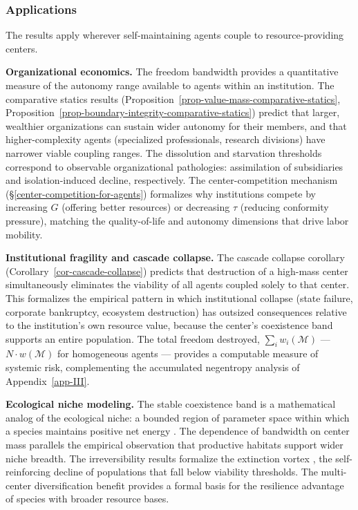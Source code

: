 \documentclass[11pt]{article}
\theoremstyle{plain}
\theoremstyle{definition}
\theoremstyle{remark}
\let\origsubsubsection\subsubsection
\renewcommand{\subsubsection}{\needspace{4\baselineskip}\origsubsubsection}
\begin{document}
\subsubsection{Applications}\label{applications-5}

The results apply wherever self-maintaining agents couple to
resource-providing centers.

\textbf{Organizational economics.} The freedom bandwidth provides a
quantitative measure of the autonomy range available to agents within an
institution. The comparative statics results
(Proposition~\ref{prop-value-mass-comparative-statics},
Proposition~\ref{prop-boundary-integrity-comparative-statics}) predict
that larger, wealthier organizations can sustain wider autonomy for
their members, and that higher-complexity agents (specialized
professionals, research divisions) have narrower viable coupling ranges.
The dissolution and starvation thresholds correspond to observable
organizational pathologies: assimilation of subsidiaries and
isolation-induced decline, respectively. The center-competition
mechanism (§\ref{center-competition-for-agents}) formalizes why
institutions compete by increasing \(G\) (offering better resources) or
decreasing \(\tau\) (reducing conformity pressure), matching the
quality-of-life and autonomy dimensions that drive labor mobility.

\textbf{Institutional fragility and cascade collapse.} The cascade
collapse corollary (Corollary~\ref{cor-cascade-collapse}) predicts that
destruction of a high-mass center simultaneously eliminates the
viability of all agents coupled solely to that center. This formalizes
the empirical pattern in which institutional collapse (state failure,
corporate bankruptcy, ecosystem destruction) has outsized consequences
relative to the institution's own resource value, because the center's
coexistence band supports an entire population. The total freedom
destroyed, \(\sum_i w_i(\mathcal{M})\) --- \(N \cdot w(\mathcal{M})\)
for homogeneous agents --- provides a computable measure of systemic
risk, complementing the accumulated negentropy analysis of
Appendix~\ref{app-III}.

\textbf{Ecological niche modeling.} The stable coexistence band is a
mathematical analog of the ecological niche: a bounded region of
parameter space within which a species maintains positive net energy
\citep{Tilman1982}. The dependence of bandwidth on center mass parallels
the empirical observation that productive habitats support wider niche
breadth. The irreversibility results formalize the extinction vortex
\citep{Gilpin1986}, the self-reinforcing decline of populations that
fall below viability thresholds. The multi-center diversification
benefit provides a formal basis for the resilience advantage of species
with broader resource bases.
\end{document}
